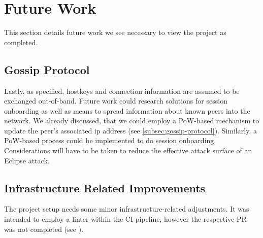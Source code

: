 \section{Future Work}\label{sec:future-work}

This section details future work we see necessary to view the project as completed.

\subsection{Gossip Protocol}\label{subsec:gossip-protocol-future-work}

Lastly, as specified, hostkeys and connection information are assumed to be exchanged out-of-band.
Future work could research solutions for session onboarding as well as means to spread
information about known peers into the network.
We already discussed, that we could employ a PoW-based mechanism to update the peer's associated ip address (see \autoref{subsec:gossip-protocol}).
Similarly, a PoW-based process could be implemented to do session onboarding.
Considerations will have to be taken to reduce the effective attack surface of an Eclipse attack.

\subsection{Infrastructure Related Improvements}\label{subsec:infrastructure-related}

The project setup needs some minor infrastructure-related adjustments.
It was intended to employ a linter within the CI pipeline, however the respective PR
was not completed (see \href{https://gitlab.lrz.de/netintum/teaching/p2psec\_projects\_2022/Gossip-10/-/merge_requests/3}{}).
